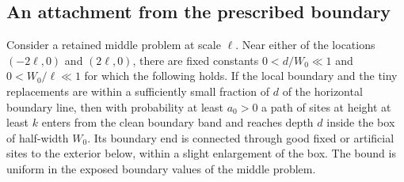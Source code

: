 \subsection{An attachment from the prescribed boundary}

\begin{lemma}\label{lem:boundary-attachment}
Consider a retained middle problem at scale $\ell$.  Near either of the
locations $(-2\ell,0)$ and $(2\ell,0)$, there are fixed constants
$0<d/W_0\ll1$ and $0<W_0/\ell\ll1$ for which the following holds.
If the local boundary and the tiny replacements are within a sufficiently
small fraction of $d$ of the horizontal boundary line, then with probability
at least $a_0>0$ a path of sites at height at least $k$ enters from the clean
boundary band and reaches depth $d$ inside the box of half-width $W_0$.
Its boundary end is connected through good fixed or artificial sites to
the exterior below, within a slight enlargement of the box.  The bound is
uniform in the exposed boundary values of the middle problem.
\end{lemma}

